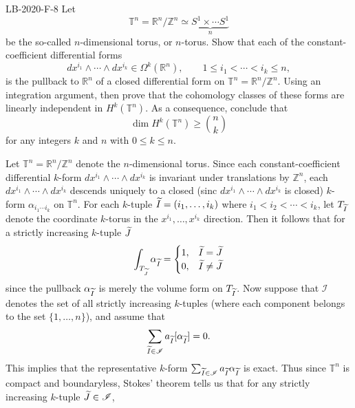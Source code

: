 \documentclass{article}
\begin{document}
	\begin{prb}{LB-2020-F-8}
		Let $$\mathbb{T}^{n} = \mathbb{R}^{n}/\mathbb{Z}^{n} \simeq \underbrace{S^{1} \times \dotsm S^{1}}_{n}$$ be the so-called $n$-dimensional torus, or $n$-torus. Show that each of the constant-coefficient differential forms 
		\begin{equation*}
			dx^{i_{1}} \wedge \dotsm \wedge dx^{i_{k}} \in \Omega^{k}(\mathbb{R}^{n}), \qquad 1 \leq i_{1} < \dotsm < i_{k} \leq n, 
		\end{equation*}
		is the pullback to $\mathbb{R}^{n}$ of a closed differential form on $\mathbb{T}^{n} = \mathbb{R}^{n}/\mathbb{Z}^{n}$. Using an integration argument, then prove that the cohomology classes of these forms are linearly independent in $H^{k}(\mathbb{T}^{n})$. As a consequence, conclude that 
		\begin{equation*}
			\dim{H^{k}(\mathbb{T}^{n})} \geq \binom{n}{k}
		\end{equation*}
		for any integers $k$ and $n$ with $0 \leq k \leq n$. 
	\end{prb}
	Let $\mathbb{T}^{n}= \mathbb{R}^{n}/\mathbb{Z}^{n}$ denote the $n$-dimensional torus. Since each constant-coefficient differential $k$-form $dx^{i_{1}}\wedge \dotsm \wedge dx^{i_{k}}$ is invariant under translations by $\mathbb{Z}^{n}$, each $dx^{i_{1}} \wedge \dotsm \wedge dx^{i_{k}}$ descends uniquely to a closed (sinc $dx^{i_{1}} \wedge \dotsm \wedge dx^{i_{k}}$ is closed) $k$-form $\alpha_{i_{1}\dotsm i_{k}}$ on $\mathbb{T}^{n}$. For each $k$-tuple $\widetilde{I} = (i_{1}, \ldots, i_{k})$ where $i_{1} < i_{2} < \dotsm < i_{k}$, let $T_{\widetilde{I}}$ denote the coordinate $k$-torus in the $x^{i_{1}}, \ldots, x^{i_{k}}$ direction. Then it follows that for a strictly increasing $k$-tuple $\widetilde{J}$  
	\begin{equation*}
		\int_{T_{\widetilde{J}}}\alpha_{\widetilde{I}} = \begin{cases}1, & \widetilde{I} = \widetilde{J} \\ 0, & \widetilde{I} \neq \widetilde{J} \end{cases}
	\end{equation*}
	since the pullback $\alpha_{\widetilde{I}}$ is merely the volume form on $T_{\widetilde{I}}$. 
	Now suppose that $\mathscr{I}$ denotes the set of all strictly increasing $k$-tuples (where each component belongs to the set $\{1, \ldots, n\}$), and assume that  
	\begin{equation*}
		\sum_{\widetilde{I} \in \mathscr{I}}a_{\widetilde{I}}[\alpha_{\widetilde{I}}] = 0. 
	\end{equation*} 
	This implies that the representative $k$-form $\sum_{\widetilde{I} \in \mathscr{I}}a_{\widetilde{I}}\alpha_{\widetilde{I}}$ is exact. Thus since $\mathbb{T}^{n}$ is compact and boundaryless, Stokes' theorem tells us that for any strictly increasing $k$-tuple $\widetilde{J} \in \mathscr{I}$, 
\end{document}
